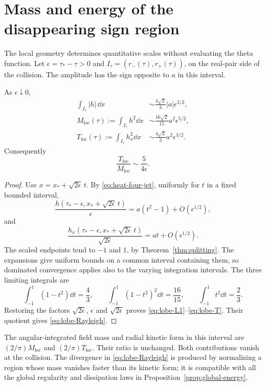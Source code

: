 \section{Mass and energy of the disappearing sign region}\label{sec:lobe}

The local geometry determines quantitative scales without evaluating
the theta function. Let \(\epsilon=\tau_*-\tau>0\) and
\(I_\tau=(r_-(\tau),r_+(\tau))\), on the real-pair side of the
collision. The amplitude has the sign opposite to \(a\) in this interval.

\begin{theorem}\label{thm:lobe}
As \(\epsilon\downarrow0\),
\begin{align}
 \int_{I_\tau}|h|\,\dd x
 &\sim\frac{4\sqrt2}{3}|a|\epsilon^{3/2},\label{eq:lobe-L1}\\
 M_{\mathrm{loc}}(\tau):=\int_{I_\tau}h^2\dd x
 &\sim\frac{16\sqrt2}{15}a^2\epsilon^{5/2},\label{eq:lobe-M}\\
 T_{\mathrm{loc}}(\tau):=\int_{I_\tau}h_x^2\dd x
 &\sim\frac{4\sqrt2}{3}a^2\epsilon^{3/2}.\label{eq:lobe-T}
\end{align}
Consequently
\begin{equation}\label{eq:lobe-Rayleigh}
 \frac{T_{\mathrm{loc}}}{M_{\mathrm{loc}}}
 \sim\frac{5}{4\epsilon}.
\end{equation}
\end{theorem}
\begin{proof}
Use \(x=x_*+\sqrt{2\epsilon}\,t\). By
\eqref{eq:heat-four-jet}, uniformly for \(t\) in a fixed bounded interval,
\[
 \frac{h(\tau_*-\epsilon,x_*+\sqrt{2\epsilon}\,t)}{\epsilon}
 =a(t^2-1)+O(\epsilon^{1/2}),
\]
and
\[
 \frac{h_x(\tau_*-\epsilon,x_*+\sqrt{2\epsilon}\,t)}
      {\sqrt{2\epsilon}}
 =at+O(\epsilon^{1/2}).
\]
The scaled endpoints tend to \(-1\) and \(1\), by
Theorem~\ref{thm:splitting}. The expansions give uniform bounds on
a common interval containing them, so dominated convergence applies
also to the varying integration intervals. The three limiting
integrals are
\[
 \int_{-1}^1(1-t^2)\dd t=\frac43,\qquad
 \int_{-1}^1(1-t^2)^2\dd t=\frac{16}{15},\qquad
 \int_{-1}^1t^2\dd t=\frac23.
\]
Restoring the factors \(\sqrt{2\epsilon}\), \(\epsilon\) and
\(\sqrt{2\epsilon}\) proves \eqref{eq:lobe-L1}--\eqref{eq:lobe-T}.
Their quotient gives \eqref{eq:lobe-Rayleigh}.
\end{proof}

The angular-integrated field mass and radial kinetic form in this
interval are \((2/\pi)M_{\mathrm{loc}}\) and
\((2/\pi)T_{\mathrm{loc}}\). Their ratio is unchanged. Both contributions
vanish at the collision. The divergence in \eqref{eq:lobe-Rayleigh}
is produced by normalizing a region whose mass vanishes faster than
its kinetic form; it is compatible with all the global regularity and
dissipation laws in Proposition~\ref{prop:global-energy}.

